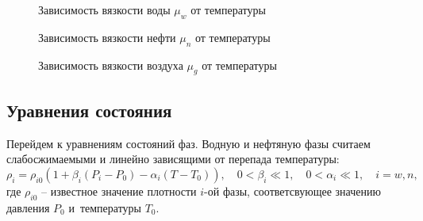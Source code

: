 \begin{figure}[h]
\begin{minipage}[h]{0.49\linewidth}
\caption{Зависимость вязкости воды $\mu_w$ от температуры}
\label{tikz_mu_w}
\end{minipage}
\hfill
\begin{minipage}[h]{0.49\linewidth}
\caption{Зависимость вязкости нефти $\mu_n$ от температуры}
\label{tikz_mu_n}
\end{minipage}
\end{figure}

\begin{figure}[h]
\begin{center}
\caption{Зависимость вязкости воздуха $\mu_g$ от температуры}
\label{tikz_mu_g}
\end{center}
\end{figure}

\subsection{Уравнения состояния}
Перейдем к уравнениям состояний фаз.
Водную и нефтяную фазы считаем слабосжимаемыми и линейно зависящими от перепада температуры:\\
$${\rho}_i = {\rho}_{i0} {(1 + {\beta}_i (P_i-P_0) - {\alpha}_i (T-T_0))},
{\quad}0<{\beta}_{i}{\ll}1,{\quad}0<{\alpha}_{i}{\ll}1,{\quad}i=w,n,$$
где ${\rho}_{i0}$ -- известное значение плотности $i$-ой фазы, соответсвующее
значению давления $P_0$ и~температуры $T_0$.


